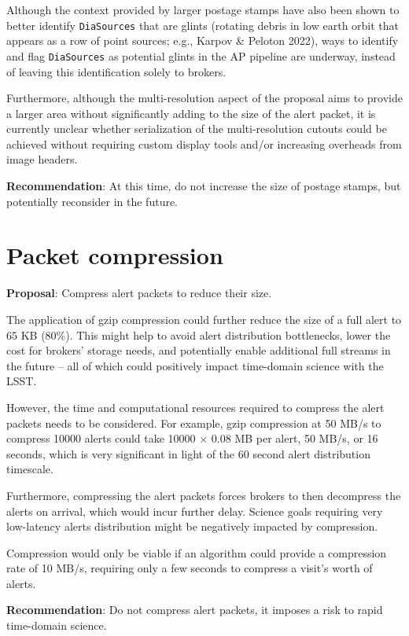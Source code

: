 \documentclass[DM,authoryear,toc]{lsstdoc}
\begin{document}
Although the context provided by larger postage stamps have also been shown to better identify \texttt{DiaSources} that are glints
(rotating debris in low earth orbit that appears as a row of point sources; e.g., Karpov & Peloton 2022), ways to identify and flag \texttt{DiaSources}
as potential glints in the AP pipeline are underway, instead of leaving this identification solely to brokers.

Furthermore, although the multi-resolution aspect of the proposal aims to provide a larger area without significantly
adding to the size of the alert packet, it is currently unclear whether serialization of the multi-resolution cutouts could be achieved without requiring custom display tools and/or increasing overheads from image headers.

\textbf{Recommendation}: At this time, do not increase the size of postage stamps, but potentially reconsider in the future.


\section{Packet compression}\label{sec:compression}

\textbf{Proposal}: Compress alert packets to reduce their size.

The application of gzip compression could further reduce the size of a full alert to 65 KB (80\%).
This might help to avoid alert distribution bottlenecks, lower the cost for brokers' storage needs, and potentially enable 
additional full streams in the future -- all of which could positively impact time-domain science with the LSST.

However, the time and computational resources required to compress the alert packets needs to be considered.
For example, gzip compression at 50 MB/s to compress 10000 alerts could take 10000 $\times$ 0.08 MB per alert, 50 MB/s, or 
16 seconds, which is very significant in light of the 60 second alert distribution timescale. 

Furthermore, compressing the alert packets forces brokers to then decompress the alerts on arrival, which would incur further delay.
Science goals requiring very low-latency alerts distribution might be negatively impacted by compression.

Compression would only be viable if an algorithm could provide a compression rate of 10 MB/s, requiring only a few seconds 
to compress a visit's worth of alerts.

\textbf{Recommendation}: Do not compress alert packets, it imposes a risk to rapid time-domain science.
\end{document}
